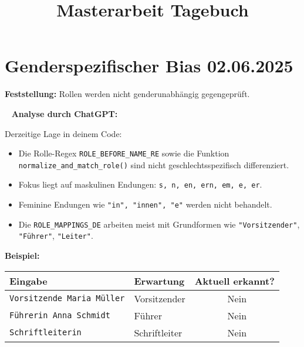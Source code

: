 \documentclass{article}
\title{\Huge Masterarbeit Tagebuch}
\newcommand{\xmark}{\ding{55}} %
\begin{document}
\maketitle
\noindent
\hrulefill

\newpage %
\tableofcontents




\noindent\hrulefill
\section{Genderspezifischer Bias \small 02.06.2025}

\textbf{Feststellung:} Rollen werden nicht genderunabhängig gegengeprüft.

\faBrain~ \textbf{Analyse durch ChatGPT:}

Derzeitige Lage in deinem Code:

\begin{itemize}
  \item Die Rolle-Regex \texttt{ROLE\_BEFORE\_NAME\_RE} sowie die Funktion \texttt{normalize\_and\_match\_role()} sind nicht geschlechtsspezifisch differenziert.
  \item Fokus liegt auf maskulinen Endungen: \texttt{s, n, en, ern, em, e, er}.
  \item Feminine Endungen wie \texttt{"in", "innen", "e"} werden nicht behandelt.
  \item Die \texttt{ROLE\_MAPPINGS\_DE} arbeiten meist mit Grundformen wie \texttt{"Vorsitzender"}, \texttt{"Führer"}, \texttt{"Leiter"}.
\end{itemize}

\vspace{0.5em}
\textbf{Beispiel:}

\begin{tabular}{|l|l|c|}
\hline
\textbf{Eingabe} & \textbf{Erwartung} & \textbf{Aktuell erkannt?} \\
\hline
\texttt{Vorsitzende Maria Müller} & Vorsitzender & \xmark~Nein \\
\texttt{Führerin Anna Schmidt} & Führer & \xmark~Nein \\
\texttt{Schriftleiterin} & Schriftleiter & \xmark~Nein \\
\hline
\end{tabular}
\end{document}
